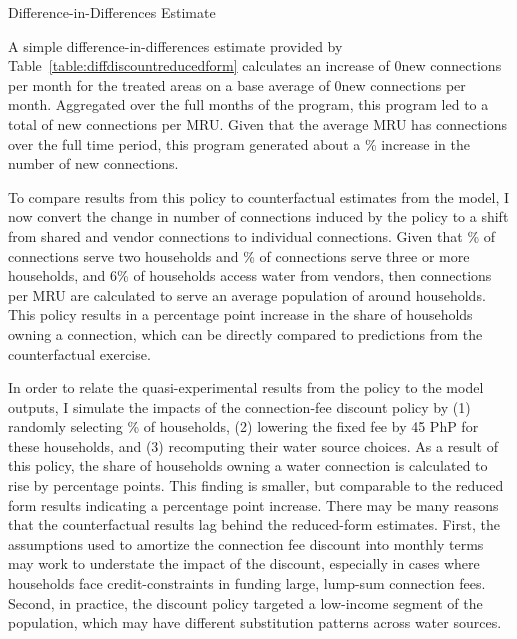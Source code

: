 \documentclass[12pt]{article}
\begin{document}
\begin{appendices}
\begin{table}
\centering
\caption{Difference-in-Differences Estimate}\label{table:diffdiscountreducedform}

\end{table}

A simple difference-in-differences estimate provided by Table~\ref{table:diffdiscountreducedform} calculates an increase of 0new connections per month for the treated areas on a base average of 0new connections per month.  Aggregated over the full months of the program, this program led to a total of new connections per MRU.  Given that the average MRU has connections over the full time period, this program generated about a \unskip\% increase in the number of new connections.  

To compare results from this policy to counterfactual estimates from the model, I now convert the change in number of connections induced by the policy to a shift from shared and vendor connections to individual connections.  Given that \unskip\% of connections serve two households and \unskip\% of connections serve three or more households, and 6\% of households access water from vendors, then connections per MRU are calculated to serve an average population of around households.  This policy results in a percentage point increase in the share of households owning a connection, which can be directly compared to predictions from the counterfactual exercise.

In order to relate the quasi-experimental results from the policy to the model outputs, I simulate the impacts of the connection-fee discount policy by (1) randomly selecting \unskip\% of households, (2) lowering the fixed fee by 45 PhP for these households, and (3) recomputing their water source choices.  As a result of this policy, the share of households owning a water connection is calculated to rise by percentage points.  This finding is smaller, but comparable to the reduced form results indicating a percentage point increase.  There may be many reasons that the counterfactual results lag behind the reduced-form estimates.  First, the assumptions used to amortize the connection fee discount into monthly terms  may work to understate the impact of the discount, especially in cases where households face credit-constraints in funding large, lump-sum connection fees.  Second, in practice, the discount policy targeted a low-income segment of the population, which may have different substitution patterns across water sources.  


\end{appendices}
\end{document}
